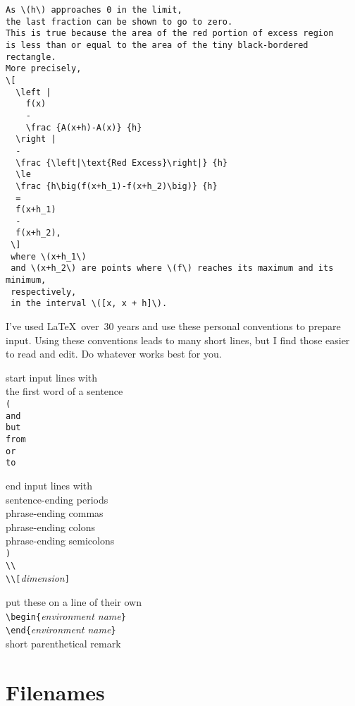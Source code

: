 \begin{verbatim}
As \(h\) approaches 0 in the limit,
the last fraction can be shown to go to zero.
This is true because the area of the red portion of excess region
is less than or equal to the area of the tiny black-bordered rectangle.
More precisely,
\[
  \left |
    f(x)
    -
    \frac {A(x+h)-A(x)} {h}
  \right |
  -
  \frac {\left|\text{Red Excess}\right|} {h}
  \le
  \frac {h\big(f(x+h_1)-f(x+h_2)\big)} {h}
  =
  f(x+h_1)
  -
  f(x+h_2),
 \]
 where \(x+h_1\)
 and \(x+h_2\) are points where \(f\) reaches its maximum and its minimum,
 respectively,
 in the interval \([x, x + h]\).
\end{verbatim}


I've used \LaTeX\ over~30 years
and use these personal conventions
to prepare input.
Using these conventions leads
to many short lines,
but I find those easier
to read and edit.
Do whatever works best for you.

 start input lines with\\
   the first word of a sentence\\
   \verb+(+\\
   \verb+and+\\
   \verb+but+\\
   \verb+from+\\
   \verb+or+\\
   \verb+to+

\NL
{} end input lines with\\
   sentence-ending periods\\
   phrase-ending commas\\
   phrase-ending colons\\
   phrase-ending semicolons\\
   \verb+)+\\
   \verb+\\+\\
   \verb+\\[+\textit{dimension}\verb+]+

\NL
{} put these on a line of their own\\
   \verb+\begin{+\textit{environment name}\verb+}+\\
   \verb+\end{+\textit{environment name}\verb+}+\\
   short parenthetical remark


\section{Filenames}

